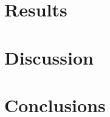 \documentclass{article}
\begin{document}


\section{Results}
\label{sec:results}




\section{Discussion}
\label{sec:discussion}




\section{Conclusions}
\label{sec:conclusions}






\end{document}
